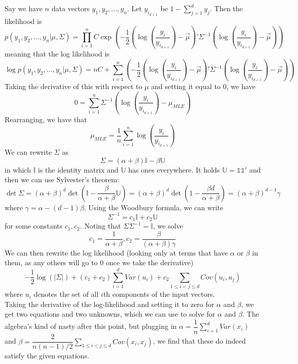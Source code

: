 \documentclass[10pt]{article}
\begin{document}
\subsection{}
Say we have $n$ data vectors $y_1,y_2,\ldots,y_n$. Let $y_{i_{d+1}}$ be $1-\sum_{j=1}^d y_j$. Then the likelihood is
\[p(y_1,y_2,\ldots,y_n | \mu, \Sigma) = \prod_{i=1}^n C\exp\left(-\dfrac{1}{2}\left(\log\left(\dfrac{y_i}{y_{i_{d+1}}}\right) - \vec{\mu}\right)'\Sigma^{-1}\left(\log\left(\dfrac{y_i}{y_{i_{d+1}}}\right) - \vec{\mu}\right)\right)\]
meaning that the log likelihood is 
\[\log p(y_1,y_2,\ldots,y_n | \mu, \Sigma) = nC + \sum_{i=1}^n \left(-\dfrac{1}{2}\left(\log\left(\dfrac{y_i}{y_{i_{d+1}}}\right) - \vec{\mu}\right)'\Sigma^{-1}\left(\log\left(\dfrac{y_i}{y_{i_{d+1}}}\right) - \vec{\mu}\right)\right)\]
Taking the derivative of this with respect to $\mu$ and setting it equal to 0, we have
\[0 = \sum_{i=1}^n \Sigma^{-1}(\log\left(\dfrac{y_i}{y_{i_{d+1}}}\right) - \mu_{MLE})\]
Rearranging, we have that 
\[\mu_{MLE} = \dfrac{1}{n} \sum_{i=1}^n \log\left(\dfrac{y_i}{y_{i_{d+1}}}\right)\]
We can rewrite $\Sigma$ as
\[\Sigma = (\alpha + \beta)\mathbb{I}-\beta\mathbb{U}\]
in which $\mathbb{I}$ is the identity matrix and $\mathbb{U}$ has ones everywhere. It holds $\mathbb{U} = \mathbb{1}\mathbb{1}'$ and then we can use Sylvester's theorem:
\[\det\Sigma=(\alpha+\beta)^d\det(\mathbb{I}-\dfrac{\beta}{\alpha+\beta}\mathbb{U})=(\alpha+\beta)^d\det(1-\dfrac{\beta d}{\alpha+\beta})=(\alpha+\beta)^{d-1}\gamma\]
where $\gamma=\alpha-(d-1)\beta$.
Using the Woodbury formula, we can write
\[\Sigma^{-1}=c_1\mathbb{I}+c_2\mathbb{U}\]
for some constants $c_1, c_2$.
Noting that $\Sigma\Sigma^{-1} = \mathbb{I}$, we solve
\[c_1 = \dfrac{1}{\alpha+\beta}, c_2=\dfrac{\beta}{(\alpha+\beta)\gamma}\]
We can then rewrite the log likelihood (looking only at terms that have $\alpha$ or $\beta$ in them, as any others will go to 0 once we take the derivative)
\[-\dfrac{1}{2}\log(|\Sigma|) + (c_1+c_2) \sum_{i=1}^d Var(u_i) + c_2 \sum_{1 \leq i < j \leq d} Cov(u_i,u_j) \]
where $u_i$ denotes the set of all $i$th components of the input vectors.\\
Taking the derivative of the log-likelihood and setting it to zero for $\alpha$ and $\beta$, we get two equations and two unknowns, which we can use to solve for $\alpha$ and $\beta$. 
The algebra's kind of nasty after this point, but plugging in $\alpha = \dfrac{1}{n}\sum_{i=1}^d Var(x_i)$ and $\beta = \dfrac{2}{n(n-1)/2}\sum_{1 \leq i < j \leq d} Cov(x_i,x_j)$, we find that these do indeed satisfy the given equations.
\end{document}

